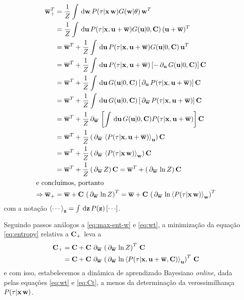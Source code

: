 \begin{align}\label{eq:wt}
\wT^T & = \frac{1}{\partf}\int\msr{\rl}\lkl\gt\,\rl^T \notag \\
      & = \frac{1}{\partf}\int\msr{\rlu}\lklu\gu\,(\rlu+\wt)^T \notag \\
    & = \wt^T + \frac{1}{\partf}\int\msr{\rlu}\lklu\gu\,\rlu^T \notag \\
    & = \wt^T + \frac{1}{\partf}\int\msr{\rlu}\lklu\inbk{-\del{\vec{u}}\gu}\Ct \notag \\
    & = \wt^T + \frac{1}{\partf}\int\msr{\rlu}\gu\inbk{\del{\vec{u}}\lklu}\Ct \notag \\
    & = \wt^T + \frac{1}{\partf}\int\msr{\rlu}\gu\inbk{\delwt\lklu}\Ct \notag \\
    & = \wt^T + \frac{1}{\partf}\delwt\inbk{\int\msr{\rlu}\gu\lklu}\Ct \notag \\
    & = \wt^T + \frac{1}{\partf}\inpr{\delwt\Ex{\lklu}_{\rlu}}\Ct \notag \\
    & = \wt^T + \frac{1}{\partf}\inpr{\delwt\Ex{\lkl}_{\rl}}\Ct \notag \\
    & = \wt^T + \frac{1}{\partf}\inpr{\delwt\partf}\Ct
    = \wt^T + \inpr{\delwt\ln\partf}\Ct \notag \\
    \intertext{e concluímos, portanto}
    \Rightarrow \wT & = \wt + \Ct\,\inpr{\delwt \ln \partf}^T
     = \wt + \Ct\,\inpr{\delwt \ln \Ex{\lkl}_{\rl}}^T
\end{align}
com a notação $\Ex{\cdots}_{\vec{z}}=\int\msr{\vec{z}}P(\vec{z})\inbk{\cdots}$.

Seguindo passos análogos a \eqref{eq:max-ent-w} e \eqref{eq:wt}, a minimização da equação \eqref{eq:entropy} relativa a $\mathbf{C}_+$ leva a
\begin{align}\label{eq:Ct}
  \CT & = \Ct + \Ct\,\delwt \inpr{\delwt \ln \partf}^T\,\Ct \notag \\
  & = \Ct + \Ct\,\delwt \inpr{\delwt \ln\Ex{P(\tau|\vec{x},\rlu+\wt,\Ct)}_{\rlu}}^T\,\Ct
\end{align}
e com isso, estabelecemos a dinâmica de aprendizado Bayesiano \emph{online},
dada pelas equações \eqref{eq:wt} e \eqref{eq:Ct}, a menos da determinação da
verossimilhança $P(\tau|\mathbf{x}\,\mathbf{w})$.


